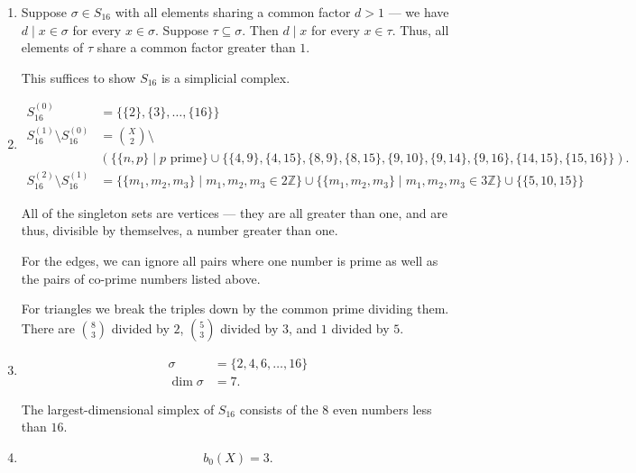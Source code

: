 \documentclass[12 pt, letterpaper]{hmcpset}
\begin{document}
\begin{solution}
	\begin{enumerate}
		\item Suppose $\sigma \in S_{16}$ with all elements sharing a common factor $d > 1$ --- we have $d \mid x \in \sigma$ for every $x \in \sigma$. Suppose $\tau \subseteq \sigma$. Then $d \mid x$ for every $x \in \tau$. Thus, all elements of $\tau$ share a common factor greater than $1$.

			This suffices to show $S_{16}$ is a simplicial complex.

		\item 
			\[
				\boxed{
					\begin{split}
						S_{16}^{(0)} & = \{ \{ 2 \}, \{ 3 \}, \dots, \{ 16 \} \} \\
						S_{16}^{(1)} \setminus S_{16}^{(0)} & = \binom{X}{2} \setminus \\
										    & \left (\{ \{ n, p \} \mid p \text{ prime} \} \cup \{ \{ 4, 9 \}, \{ 4, 15 \}, \{ 8, 9 \}, \{ 8, 15 \}, \{ 9, 10 \}, \{ 9, 14 \}, \{ 9, 16 \}, \{ 14, 15 \}, \{ 15, 16 \} \} \right ) . \\
						S_{16}^{(2)} \setminus S_{16}^{(1)} & = \{ \{ m_{1}, m_{2}, m_{3} \} \mid m_{1}, m_{2}, m_{3} \in 2 \mathbb{Z} \} \cup \{ \{ m_{1}, m_{2}, m_{3} \} \mid m_{1}, m_{2}, m_{3} \in 3 \mathbb{Z} \} \cup \{ \{ 5, 10, 15 \} \}
					\end{split}
				}
			\]

			All of the singleton sets are vertices --- they are all greater than one, and are thus, divisible by themselves, a number greater than one.

			For the edges, we can ignore all pairs where one number is prime as well as the pairs of co-prime numbers listed above.

			For triangles we break the triples down by the common prime dividing them. There are $\binom{8}{3}$ divided by $2$, $\binom{5}{3}$ divided by $3$, and $1$ divided by $5$.

		\item
			\[
				\boxed{
					\begin{split}
						\sigma & = \{ 2, 4, 6, \dots, 16 \} \\
						\dim \sigma & = 7.
					\end{split}
				}
			\]

			The largest-dimensional simplex of $S_{16}$ consists of the $8$ even numbers less than $16$.

		\item
			\[
				\boxed{
					b_{0}(X) = 3.
				}
			\]


\end{enumerate}
\end{solution}
\end{document}
